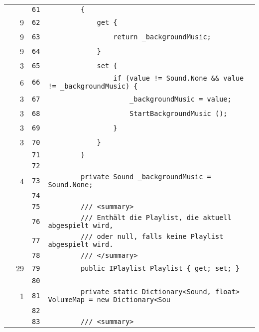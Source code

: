 \documentclass[a4paper,10pt]{article}
\begin{document}
\begin{longtable}[l]{lrrl}
\cellcolor{gray} &  & \verb~61~ & \verb~        {~\\
\cellcolor{green} & 9 & \verb~62~ & \verb~            get {~\\
\cellcolor{green} & 9 & \verb~63~ & \verb~                return _backgroundMusic;~\\
\cellcolor{green} & 9 & \verb~64~ & \verb~            }~\\
\cellcolor{green} & 3 & \verb~65~ & \verb~            set {~\\
\cellcolor{green} & 6 & \verb~66~ & \verb~                if (value != Sound.None && value != _backgroundMusic) {~\\
\cellcolor{green} & 3 & \verb~67~ & \verb~                    _backgroundMusic = value;~\\
\cellcolor{green} & 3 & \verb~68~ & \verb~                    StartBackgroundMusic ();~\\
\cellcolor{green} & 3 & \verb~69~ & \verb~                }~\\
\cellcolor{green} & 3 & \verb~70~ & \verb~            }~\\
\cellcolor{gray} &  & \verb~71~ & \verb~        }~\\
\cellcolor{gray} &  & \verb~72~ & \verb~~\\
\cellcolor{green} & 4 & \verb~73~ & \verb~        private Sound _backgroundMusic = Sound.None;~\\
\cellcolor{gray} &  & \verb~74~ & \verb~~\\
\cellcolor{gray} &  & \verb~75~ & \verb~        /// <summary>~\\
\cellcolor{gray} &  & \verb~76~ & \verb~        /// Enthält die Playlist, die aktuell abgespielt wird,~\\
\cellcolor{gray} &  & \verb~77~ & \verb~        /// oder null, falls keine Playlist abgespielt wird.~\\
\cellcolor{gray} &  & \verb~78~ & \verb~        /// </summary>~\\
\cellcolor{green} & 29 & \verb~79~ & \verb~        public IPlaylist Playlist { get; set; }~\\
\cellcolor{gray} &  & \verb~80~ & \verb~~\\
\cellcolor{green} & 1 & \verb~81~ & \verb~        private static Dictionary<Sound, float> VolumeMap = new Dictionary<Sou~\\
\cellcolor{gray} &  & \verb~82~ & \verb~~\\
\cellcolor{gray} &  & \verb~83~ & \verb~        /// <summary>~\\

\end{longtable}
\end{document}
